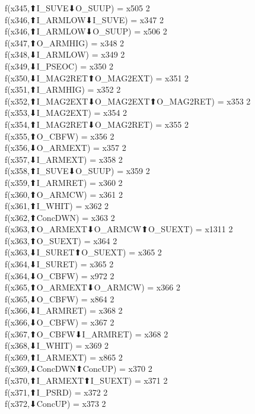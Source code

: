 f(x345,⬆I_SUVE⬇O_SUUP) = x505 {2} \\
f(x346,⬆I_ARMLOW⬇I_SUVE) = x347 {2} \\
f(x346,⬆I_ARMLOW⬇O_SUUP) = x506 {2} \\
f(x347,⬆O_ARMHIG) = x348 {2} \\
f(x348,⬇I_ARMLOW) = x349 {2} \\
f(x349,⬇I_PSEOC) = x350 {2} \\
f(x350,⬇I_MAG2RET⬆O_MAG2EXT) = x351 {2} \\
f(x351,⬆I_ARMHIG) = x352 {2} \\
f(x352,⬆I_MAG2EXT⬇O_MAG2EXT⬆O_MAG2RET) = x353 {2} \\
f(x353,⬇I_MAG2EXT) = x354 {2} \\
f(x354,⬆I_MAG2RET⬇O_MAG2RET) = x355 {2} \\
f(x355,⬆O_CBFW) = x356 {2} \\
f(x356,⬇O_ARMEXT) = x357 {2} \\
f(x357,⬇I_ARMEXT) = x358 {2} \\
f(x358,⬆I_SUVE⬇O_SUUP) = x359 {2} \\
f(x359,⬆I_ARMRET) = x360 {2} \\
f(x360,⬆O_ARMCW) = x361 {2} \\
f(x361,⬆I_WHIT) = x362 {2} \\
f(x362,⬆ConcDWN) = x363 {2} \\
f(x363,⬆O_ARMEXT⬇O_ARMCW⬆O_SUEXT) = x1311 {2} \\
f(x363,⬆O_SUEXT) = x364 {2} \\
f(x363,⬇I_SURET⬆O_SUEXT) = x365 {2} \\
f(x364,⬇I_SURET) = x365 {2} \\
f(x364,⬇O_CBFW) = x972 {2} \\
f(x365,⬆O_ARMEXT⬇O_ARMCW) = x366 {2} \\
f(x365,⬇O_CBFW) = x864 {2} \\
f(x366,⬇I_ARMRET) = x368 {2} \\
f(x366,⬇O_CBFW) = x367 {2} \\
f(x367,⬆O_CBFW⬇I_ARMRET) = x368 {2} \\
f(x368,⬇I_WHIT) = x369 {2} \\
f(x369,⬆I_ARMEXT) = x865 {2} \\
f(x369,⬇ConcDWN⬆ConcUP) = x370 {2} \\
f(x370,⬆I_ARMEXT⬆I_SUEXT) = x371 {2} \\
f(x371,⬆I_PSRD) = x372 {2} \\
f(x372,⬇ConcUP) = x373 {2} \\

